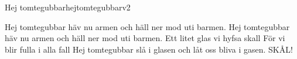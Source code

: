 \begin{song}{Hej tomtegubbar}{hejtomtegubbarv2}
\begin{vers}
Hej tomtegubbar häv nu armen
och häll ner mod uti barmen.
Hej tomtegubbar häv nu armen
och häll ner mod uti barmen.
Ett litet glas vi hyfsa skall
För vi blir fulla i alla fall
Hej tomtegubbar slå i glasen
och låt oss bliva i gasen.
SKÅL!
\end{vers}
\end{song}
